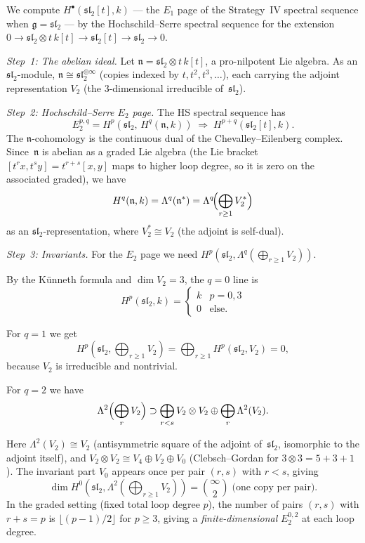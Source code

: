 \begin{computation}
\label{comp:current-algebra-E1}
We compute $H^\bullet(\mathfrak{sl}_2[t], k)$ --- the $E_1$
page of the Strategy~IV spectral sequence when
$\mathfrak{g} = \mathfrak{sl}_2$ --- by the Hochschild--Serre
spectral sequence for the extension
$0 \to \mathfrak{sl}_2 \otimes t\,k[t] \to \mathfrak{sl}_2[t]
\to \mathfrak{sl}_2 \to 0$.

\emph{Step~1: The abelian ideal.}
Let $\mathfrak{n} = \mathfrak{sl}_2 \otimes t\,k[t]$, a
pro-nilpotent Lie algebra.  As an $\mathfrak{sl}_2$-module,
$\mathfrak{n} \cong \mathfrak{sl}_2^{\oplus \infty}$
(copies indexed by $t, t^2, t^3, \ldots$), each carrying the
adjoint representation $V_2$ (the $3$-dimensional irreducible
of~$\mathfrak{sl}_2$).

\emph{Step~2: Hochschild--Serre $E_2$ page.}
The HS spectral sequence has
\[
E_2^{p,q} = H^p(\mathfrak{sl}_2,\, H^q(\mathfrak{n}, k))
\;\Longrightarrow\; H^{p+q}(\mathfrak{sl}_2[t], k).
\]
The $\mathfrak{n}$-cohomology is the continuous dual of the
Chevalley--Eilenberg complex.  Since~$\mathfrak{n}$ is
abelian as a graded Lie algebra (the Lie bracket
$[t^r x, t^s y] = t^{r+s}[x,y]$ maps to higher loop degree, so
it is zero on the associated graded), we have
\[
H^q(\mathfrak{n}, k) = \Lambda^q(\mathfrak{n}^*)
= \Lambda^q\!\Bigl(\bigoplus_{r \ge 1} V_2^*\Bigr)
\]
as an $\mathfrak{sl}_2$-representation, where
$V_2^* \cong V_2$ (the adjoint is self-dual).

\emph{Step~3: Invariants.}
For the $E_2$ page we need
$H^p(\mathfrak{sl}_2, \Lambda^q(\bigoplus_{r \ge 1} V_2))$.

By the K\"unneth formula and $\dim V_2 = 3$, the $q = 0$ line is
\[
H^p(\mathfrak{sl}_2, k)
= \begin{cases} k & p = 0, 3 \\ 0 & \text{else}. \end{cases}
\]

For $q = 1$ we get
\[
H^p(\mathfrak{sl}_2, \bigoplus_{r \ge 1} V_2)
= \bigoplus_{r \ge 1} H^p(\mathfrak{sl}_2, V_2)
= 0,
\]
because $V_2$ is irreducible and nontrivial.

For $q = 2$ we have
\[
\Lambda^2\Bigl(\bigoplus_r V_2\Bigr)
\supset
\bigoplus_{r < s} V_2 \otimes V_2
\oplus \bigoplus_r \Lambda^2(V_2).
\]

Here $\Lambda^2(V_2) \cong V_2$ (antisymmetric square of the
adjoint of~$\mathfrak{sl}_2$, isomorphic to the adjoint itself),
and $V_2 \otimes V_2 \cong V_4 \oplus V_2 \oplus V_0$
(Clebsch--Gordan for $3 \otimes 3 = 5 + 3 + 1$).  The invariant
part $V_0$ appears once per pair $(r,s)$ with $r < s$, giving
\[
\dim H^0(\mathfrak{sl}_2, \Lambda^2(\textstyle\bigoplus_{r \ge 1}
V_2)) = \binom{\infty}{2} \;\text{(one copy per pair)}.
\]
In the graded setting (fixed total loop degree $p$), the number of
pairs $(r,s)$ with $r + s = p$ is $\lfloor (p-1)/2 \rfloor$ for
$p \ge 3$, giving a \emph{finite-dimensional} $E_2^{0,2}$
at each loop degree.


\end{computation}
